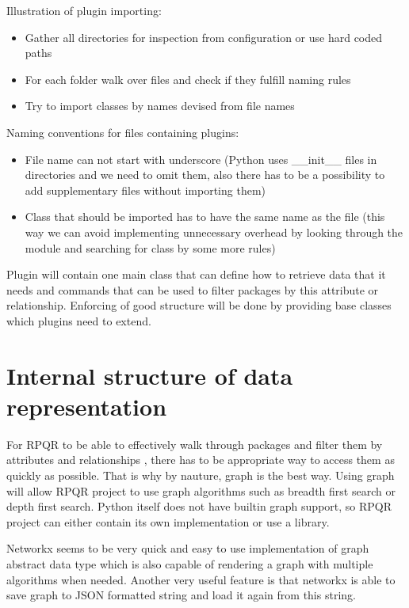 Illustration of plugin importing:
\begin{itemize}
  \item Gather all directories for inspection from configuration or use hard coded paths
  \item For each folder walk over files and check if they fulfill naming rules
  \item Try to import classes by names devised from file names
\end{itemize}

Naming conventions for files containing plugins:
\begin{itemize}
  \item File name can not start with underscore (Python uses \_\_init\_\_ files
  in directories and we need to omit them, also there has to be a possibility to add supplementary files without importing them)
  \item Class that should be imported has to have the same name as the file (this way we can avoid
  implementing unnecessary overhead by looking through the module and searching for class by some
  more rules)
\end{itemize}

Plugin will contain one main class that can define how to retrieve data that it needs and commands
that can be used to filter packages by this attribute or relationship. Enforcing of good structure
will be done by providing base classes which plugins need to extend.

\newpage

\section{Internal structure of data representation}
For RPQR to be able to effectively walk through packages and filter them by attributes and relationships
, there has to be appropriate way to access them as quickly as possible. That is why by nauture, graph
is the best way. Using graph will allow RPQR project to use graph algorithms such as breadth first search
or depth first search. Python itself does not have builtin graph support, so RPQR project can either
contain its own implementation or use a library.

Networkx seems to be very quick and easy to use implementation of graph abstract data type which is
also capable of rendering a graph with multiple algorithms when needed. Another very useful feature
is that networkx is able to save graph to JSON formatted string and load it again from this string.


